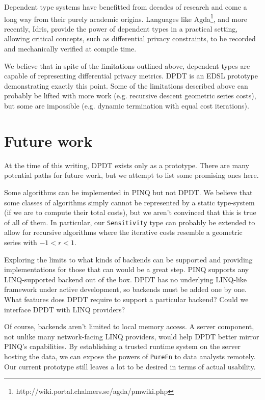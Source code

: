 \documentclass[12pt]{report}
\begin{document}
Dependent type systems have benefitted from decades of research and come a long way from their purely academic origins.
Languages like Agda\footnote{http://wiki.portal.chalmers.se/agda/pmwiki.php}, and more recently, Idris, provide the power of dependent types in a practical setting, allowing critical concepts, such as differential privacy constraints, to be recorded and mechanically verified at compile time.

We believe that in spite of the limitations outlined above, dependent types are capable of representing differential privacy metrics.
DPDT is an EDSL prototype demonstrating exactly this point.
Some of the limitations described above can probably be lifted with more work (e.g. recursive descent geometric series costs), but some are impossible (e.g. dynamic termination with equal cost iterations).

\section{Future work}\label{sec:future_work}

At the time of this writing, DPDT exists only as a prototype.
There are many potential paths for future work, but we attempt to list some promising ones here.

Some algorithms can be implemented in PINQ but not DPDT.
We believe that some classes of algorithms simply cannot be represented by a static type-system (if we are to compute their total costs), but we aren't convinced that this is true of all of them.
In particular, our \texttt{Sensitivity} type can probably be extended to allow for recursive algorithms where the iterative costs resemble a geometric series with $-1 < r < 1$.

Exploring the limits to what kinds of backends can be supported and providing implementations for those that can would be a great step.
PINQ supports any LINQ-supported backend out of the box.
DPDT has no underlying LINQ-like framework under active development, so backends must be added one by one.
What features does DPDT require to support a particular backend?
Could we interface DPDT with LINQ providers?

Of course, backends aren't limited to local memory access.
A server component, not unlike many network-facing LINQ providers, would help DPDT better mirror PINQ's capabilities.
By establishing a trusted runtime system on the server hosting the data, we can expose the powers of \texttt{PureFn} to data analysts remotely.
Our current prototype still leaves a lot to be desired in terms of actual usability.
\end{document}

